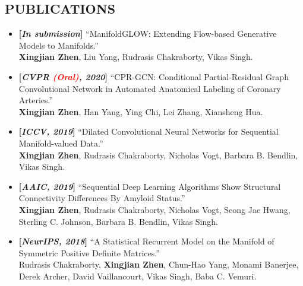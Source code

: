 \documentclass[margin]{res}
\begin{document}
\begin{resume}
\section{PUBLICATIONS}
                \begin{itemize}[noitemsep,wide=0pt,leftmargin=\dimexpr{} + 2\relax]\itemsep -0.0pt
                \item \textbf{[\emph{In submission}]} ``ManifoldGLOW: Extending Flow-based Generative Models to Manifolds.''\\
                            \textbf{Xingjian Zhen}, Liu Yang,  Rudrasis Chakraborty, Vikas Singh.   
                \item \textbf{[\emph{CVPR \textcolor{red}{(Oral)}, 2020}]} ``CPR-GCN: Conditional Partial-Residual Graph Convolutional Network in Automated Anatomical Labeling of Coronary Arteries.''\\
                            \textbf{Xingjian Zhen}, Han Yang, Ying Chi, Lei Zhang, Xiansheng Hua.   
                \item \textbf{[\emph{ICCV, 2019}]} ``Dilated Convolutional Neural Networks for Sequential Manifold-valued Data.'' \\
                             \textbf{Xingjian Zhen}, Rudrasis Chakraborty, Nicholas Vogt, Barbara B. Bendlin, Vikas Singh. 
                \item \textbf{[\emph{AAIC, 2019}]} ``Sequential Deep Learning Algorithms Show Structural Connectivity Differences By Amyloid Status.''\\
                             \textbf{Xingjian Zhen}, Rudrasis Chakraborty, Nicholas Vogt, Seong Jae Hwang, Sterling C. Johnson, Barbara B. Bendlin, Vikas Singh. 
                \item \textbf{[\emph{NeurIPS, 2018}]} ``A Statistical Recurrent Model on the Manifold of Symmetric Positive Definite Matrices.''\\
                             Rudrasis Chakraborty, \textbf{Xingjian Zhen}, Chun-Hao Yang, Monami Banerjee, Derek Archer, David Vaillancourt, Vikas Singh, Baba C. Vemuri.
                \end{itemize}


\end{resume}
\end{document}
